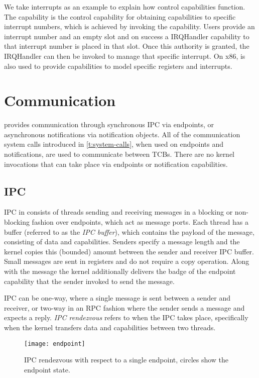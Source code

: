 We take interrupts as an example to explain how control capabilities function. The
 capability is the control capability for obtaining capabilities to specific
interrupt numbers, which is achieved by invoking the  capability.
Users provide an interrupt number and an empty slot and on success a IRQHandler capability to
that interrupt number is placed in that slot. Once this authority is granted, the IRQHandler can then be
invoked to manage that specific interrupt. On x86,  is also used to provide
capabilities to model specific registers and \IO interrupts.

\section{Communication}

\selfour provides communication through synchronous IPC via endpoints, or asynchronous notifications
via notification objects. All of the communication system calls introduced in \cref{t:system-calls},
when used on endpoints and notifications, are used to communicate between TCBs. There are no kernel
invocations that can take place via endpoints or notification capabilities. 

\subsection{IPC}
\label{p:sel4_ipc}

IPC in \selfour consists of threads sending and receiving messages in a blocking or non-blocking
fashion over endpoints, which act as
message ports. Each thread has a buffer (referred to as the \emph{IPC buffer}), which contains the payload of the message, consisting
of data and capabilities. Senders specify a message length and the kernel copies this (bounded)
amount between the sender and receiver IPC buffer. Small messages are sent in registers and do not
require a copy operation. 
Along with the message the kernel additionally delivers the badge of the endpoint capability that the sender 
invoked to send the message.

IPC can be one-way, where a single message is sent between a sender and receiver, or two-way in an
RPC fashion where the sender sends a message and expects a reply. \emph{IPC rendezvous} refers to
when the IPC takes place, specifically when the kernel transfers data and capabilities between two
threads. 

\begin{figure}
    \centering
    \texttt{[image: endpoint]}
    \caption{IPC rendezvous with respect to a single endpoint, circles show the endpoint state.}
    \label{f:endpoint}
\end{figure}


